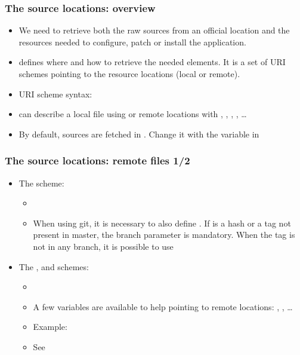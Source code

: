 \begin{frame}
  \frametitle{The source locations: overview}
  \begin{itemize}
    \item We need to retrieve both the raw sources from an official
      location and the resources needed to configure, patch or install
      the application.
    \item {} defines where and how to retrieve the
      needed elements. It is a set of URI schemes pointing to the
      resource locations (local or remote).
    \item URI scheme syntax: 
    \item {} can describe a local file using 
      or remote locations with , ,
      , , \dots
    \item By default, sources are fetched in
      . Change it with the 
      variable in 
  \end{itemize}
\end{frame}

\begin{frame}
  \frametitle{The source locations: remote files 1/2}
  \begin{itemize}
    \item The  scheme:
      \begin{itemize}
        \item {}
        \item When using git, it is necessary to also define
          . If  is a hash or a tag not
          present in master, the branch parameter is mandatory. When
          the tag is not in any branch, it is possible to use
      \end{itemize}
    \item The ,  and  schemes:
      \begin{itemize}
        \item {}
        \item A few variables are available to help pointing to remote
          locations: ,
          , \dots
        \item Example:
        \item See 
      \end{itemize}
  \end{itemize}
\end{frame}


